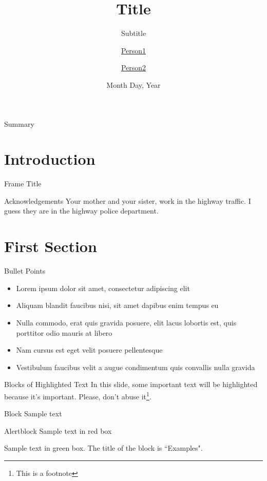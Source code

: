 \documentclass[12pt]{beamer}
\title[Title]{Title} %
\subtitle{Subtitle}
\author[Person1, Person2]{
    \href{mailto:mail1@mail.com}{Person1} \and 
    \href{mailto:mail2@mail.com} {Person2}
}
\institute[Ca' Foscari]{Ca' Foscari University of Venice }
\date{Month Day, Year}
\begin{document}
\begin{frame}
\titlepage
\end{frame}

\begin{frame}{Summary}
\tableofcontents 
\end{frame}

\section{Introduction}

\begin{frame}{Frame Title}
    \begin{block}{Acknowledgements}
    Your mother and your sister, work in the highway traffic.
    I guess they are in the highway police department.
    \end{block}
        
\end{frame}


\section{First Section}

\begin{frame}{Bullet Points}
    \begin{itemize}
        \item Lorem ipsum dolor sit amet, consectetur adipiscing elit
        \item<2-4> Aliquam blandit faucibus nisi, sit amet dapibus enim tempus eu
        \item<3-> Nulla commodo, erat quis gravida posuere, elit lacus lobortis est, quis porttitor odio mauris at libero
        \item<4> Nam cursus est eget velit posuere pellentesque
        \item<5-> Vestibulum faucibus velit a augue condimentum quis convallis nulla gravida
    \end{itemize}
\end{frame}


\begin{frame}{Blocks of Highlighted Text}
    In this slide, some important text will be \alert{highlighted} because it's important. Please, don't abuse it\footnote{This is a footnote}.

    \begin{block}{Block}
        Sample text
    \end{block}

    \begin{alertblock}{Alertblock}
        Sample text in red box
    \end{alertblock}

    \begin{examples}
        Sample text in green box. The title of the block is ``Examples".
    \end{examples}
\end{frame}
\end{document}

